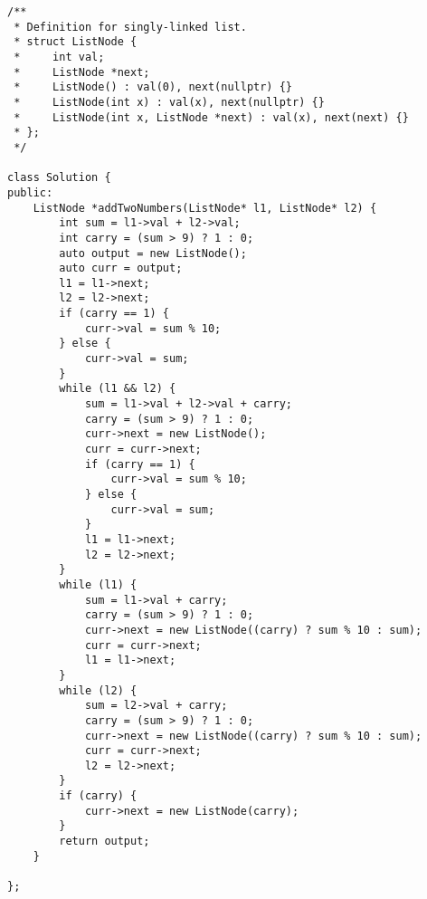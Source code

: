 \begin{lstlisting}
/**
 * Definition for singly-linked list.
 * struct ListNode {
 *     int val;
 *     ListNode *next;
 *     ListNode() : val(0), next(nullptr) {}
 *     ListNode(int x) : val(x), next(nullptr) {}
 *     ListNode(int x, ListNode *next) : val(x), next(next) {}
 * };
 */

class Solution {
public:
    ListNode *addTwoNumbers(ListNode* l1, ListNode* l2) {
        int sum = l1->val + l2->val;
        int carry = (sum > 9) ? 1 : 0;
        auto output = new ListNode();
        auto curr = output;
        l1 = l1->next;
        l2 = l2->next;
        if (carry == 1) {
            curr->val = sum % 10;
        } else {
            curr->val = sum;
        }
        while (l1 && l2) {
            sum = l1->val + l2->val + carry;
            carry = (sum > 9) ? 1 : 0;
            curr->next = new ListNode();
            curr = curr->next;
            if (carry == 1) {
                curr->val = sum % 10;
            } else {
                curr->val = sum;
            }
            l1 = l1->next;
            l2 = l2->next;
        }
        while (l1) {
            sum = l1->val + carry;
            carry = (sum > 9) ? 1 : 0;
            curr->next = new ListNode((carry) ? sum % 10 : sum);
            curr = curr->next;
            l1 = l1->next;
        }
        while (l2) {
            sum = l2->val + carry;
            carry = (sum > 9) ? 1 : 0;
            curr->next = new ListNode((carry) ? sum % 10 : sum);
            curr = curr->next;
            l2 = l2->next;
        }
        if (carry) {
            curr->next = new ListNode(carry);
        }
        return output;
    }
   
};
\end{lstlisting}
